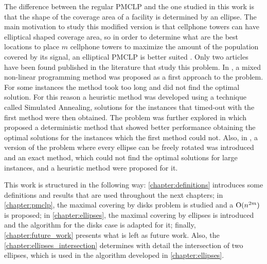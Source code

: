The difference between the regular PMCLP and the one studied in this work is that the shape of the coverage area of a facility is determined by an ellipse. The main motivation to study this modified version is that cellphone towers can have elliptical shaped coverage area, so in order to determine what are the best locations to place $m$ cellphone towers to maximize the amount of the population covered by its signal, an elliptical PMCLP is better suited \cite{canbolat}. Only two articles have been found published in the literature that study this problem. In \cite{canbolat}, a mixed non-linear programming method was proposed as a first approach to the problem. For some instances the method took too long and did not find the optimal solution. For this reason a heuristic method was developed using a technique called Simulated Annealing, solutions for the instances that timed-out with the first method were then obtained. The problem was further explored in \cite{andreta} which proposed a deterministic method that showed better performance obtaining the optimal solutions for the instances which the first method could not. Also, in \cite{andreta}, a version of the problem where every ellipse can be freely rotated was introduced and an exact method, which could not find the optimal solutions for large instances, and a heuristic method were proposed for it.

This work is structured in the following way: \autoref{chapter:definitions} introduces some definitions and results that are used throughout the next chapters; in \autoref{chapter:pmclp}, the maximal covering by disks problem is studied and a $\mathrm{O}(n^{2m})$ is proposed; in \autoref{chapter:ellipses}, the maximal covering by ellipses is introduced and the algorithm for the disks case is adapted for it; finally, \autoref{chapter:future_work} presents what is left as future work. Also, the \autoref{chapter:ellipses_intersection} determines with detail the intersection of two ellipses, which is used in the algorithm developed in \autoref{chapter:ellipses}.

